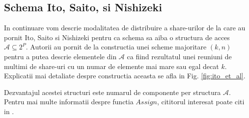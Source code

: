 \documentclass{llncs}
\begin{document}

\subsection{Schema Ito, Saito, si Nishizeki}
\label{Ito}

In continuare vom descrie modalitatea de distribuire a share-urilor de la care au pornit Ito, Saito si Nishizeki pentru ca schema sa aiba o structura de acces $\mathcal{A} \subseteq 2^P$. Autorii au pornit de la constructia unei scheme majoritare $(k, n)$ pentru a putea descrie elementele din $\mathcal{A}$ ca fiind rezultatul unei reuniuni de multimi de share-uri cu un numar de elemente mai mare sau egal decat $k$. Explicatii mai detaliate despre constructia aceasta se afla in Fig. \ref{fig:ito_et_al}.

Dezvantajul acestei structuri este numarul de componente per structura $\mathcal{A}$. Pentru mai multe informatii despre functia $Assign$, cititorul interesat poate citi in \cite{ITO:1989}.
\end{document}
